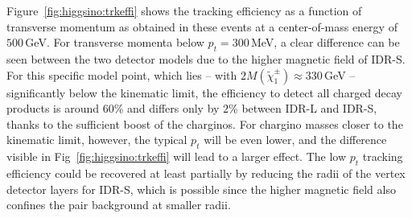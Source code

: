 Figure~\ref{fig:higgsino:trkeffi} shows the tracking efficiency as a function of transverse momentum as obtained
in these events at a center-of-mass energy of $500$\,GeV. For transverse
momenta below $p_t = 300$\,MeV, a clear difference can be seen between the two detector models due to the higher magnetic field of IDR-S. For this specific model point, which lies -- with $2 M(\tilde{\chi}^{\pm}_1) \approx 330$\,GeV -- significantly below the kinematic limit, the efficiency to detect all charged decay products is around $60$\% and differs only by $2$\% between IDR-L and IDR-S, thanks to the sufficient boost of the charginos. For chargino masses closer to the kinematic limit, however, the typical $p_t$ will be even lower, 
and the difference visible in Fig~\ref{fig:higgsino:trkeffi} will lead to a larger effect.
The low $p_t$ tracking efficiency could be recovered at least partially by reducing the radii of the vertex detector layers for IDR-S, which is possible since the higher magnetic field also confines the pair background at smaller radii.
